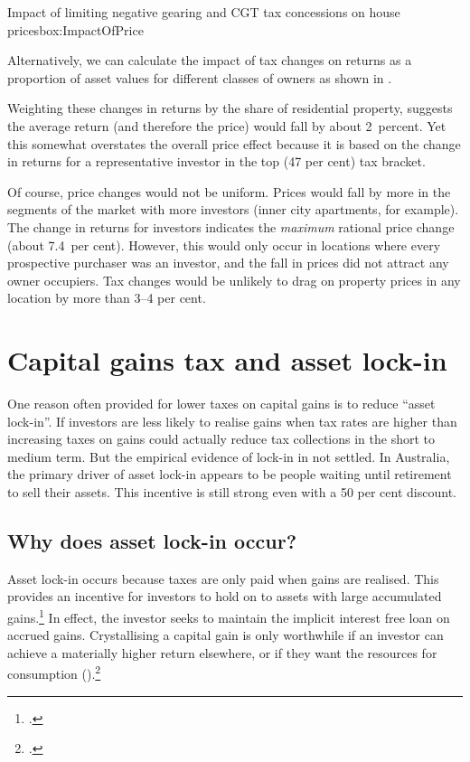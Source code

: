 \documentclass[continuous]{grattan}
\begin{document}
\begin{bigbox*}{Impact of limiting negative gearing {and CGT} tax concessions on house prices}{box:ImpactOfPrice}
\begin{table}[H]
{}

\end{table}
\vspace*{-11pt}  %

Alternatively, we can calculate the impact of tax changes on returns as a proportion of asset values for different classes of owners as shown in
.

Weighting these changes in returns by the share of residential property, suggests the average return (and therefore the price) would fall by about 2~percent. Yet this somewhat overstates the overall price effect because it is based on the change in returns for a representative investor in the top (47 per cent) tax bracket.

Of course, price changes would not be uniform. Prices would fall by more in the segments of the market with more investors (inner city apartments, for example). The change in returns for investors indicates the \emph{maximum} rational price change (about 7.4~per cent). However, this would only occur in locations where every prospective purchaser was an investor, and the fall in prices did not attract any owner occupiers. Tax changes would be unlikely to drag on property prices in any location by more than 3--4 per cent.

\end{bigbox*}

\chapter{Capital gains tax and asset lock-in}\label{appendix:CGT-asset-lock-in}
One reason often provided for lower taxes on capital gains is to reduce ``asset lock-in''. If investors are less likely to realise gains when tax rates are higher than increasing taxes on gains could actually reduce tax collections in the short to medium term. But the empirical evidence of lock-in in not settled. In Australia, the primary driver of asset lock-in appears to be people waiting until retirement to sell their assets. This incentive is still strong even with a 50 per cent discount. 

\section{Why does asset lock-in occur?}
Asset lock-in occurs because taxes are only paid when gains are realised. This provides an incentive for investors to hold on to assets with large accumulated gains.\footcite{Burman2009}  In effect, the investor seeks to maintain the implicit interest free loan on accrued gains. Crystallising a capital gain is only worthwhile if an investor can achieve a materially higher return elsewhere, or if they want the resources for consumption ().\footcite[][12]{Ingles2009a}   
\end{document}

